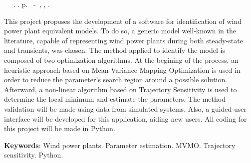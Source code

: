 \begin{resumo}

\begin{flushleft} 
	\setlength{\absparsep}{0pt} %
	\SingleSpacing 
 	\imprimirautorabr~ ~\textbf{\imprimirtitulo}.	\imprimirdata.  \pageref{LastPage}p. 
	\imprimirtipotrabalho~-~\imprimirinstituicao, \imprimirlocal, 	\imprimirdata. 
\end{flushleft}

\OnehalfSpacing

This project proposes the development of a software for identification of wind power plant equivalent models. To do so, a generic model well-known in the literature, capable of representing wind power plants during both steady-state and transients, was chosen. The method applied to identify the model is composed of two optimization algorithms. At the begining of the process, an heuristic approach based on Mean-Variance Mapping Optimization is used in order to reduce the parameter's search region around a possible solution. Afterward, a non-linear algorithm based on Trajectory Sensitivity is used to determine the local minimum and estimate the parameters. The method validation will be made using data from simulated systems. Also, a guided user interface will be developed for this application, aiding new users. All coding for this project will be made in Python.


\textbf{Keywords}: Wind power plants. Parameter estimation. MVMO. Trajectory sensitivity. Python.

\end{resumo}
